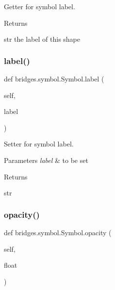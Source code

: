 Getter for symbol label. 

\begin{DoxyReturn}{Returns}


str the label of this shape 
\end{DoxyReturn}
\mbox{\label{classbridges_1_1symbol_1_1_symbol_a44d41804267e94598d0a29ca1a29c3b1}} 
\subsubsection{\texorpdfstring{label()}{label()}\hspace{0.1cm}{\footnotesize\ttfamily [2/2]}}
{\footnotesize\ttfamily def bridges.\+symbol.\+Symbol.\+label (\begin{DoxyParamCaption}\item[{}]{self,  }\item[{}]{label }\end{DoxyParamCaption})}



Setter for symbol label. 


\begin{DoxyParams}{Parameters}
{\em label} & to be set \\
\hline
\end{DoxyParams}
\begin{DoxyReturn}{Returns}


str 
\end{DoxyReturn}
\mbox{\label{classbridges_1_1symbol_1_1_symbol_a332e9461ed001268a100af2ad5a535e9}} 
\subsubsection{\texorpdfstring{opacity()}{opacity()}\hspace{0.1cm}{\footnotesize\ttfamily [1/2]}}
{\footnotesize\ttfamily def bridges.\+symbol.\+Symbol.\+opacity (\begin{DoxyParamCaption}\item[{}]{self,  }\item[{}]{float }\end{DoxyParamCaption})}



